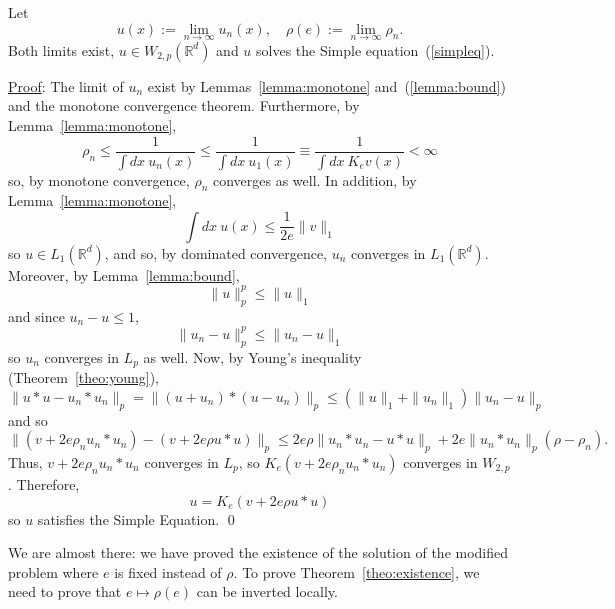 \documentclass{ian}
\begin{document}
  Let
  \begin{equation}
    u(x):=\lim_{n\to\infty}u_n(x)
    ,\quad
    \rho(e):=\lim_{n\to\infty}\rho_n
    .
  \end{equation}
  Both limits exist, $u\in W_{2,p}(\mathbb R^d)$ and $u$ solves the Simple equation\-~(\ref{simpleq}).
\endtheo
\bigskip

\indent\underline{Proof}:
  The limit of $u_n$ exist by Lemmas\-~\ref{lemma:monotone} and\-~(\ref{lemma:bound}) and the monotone convergence theorem.
  Furthermore, by Lemma\-~\ref{lemma:monotone},
  \begin{equation}
    \rho_n\leqslant\frac1{\int dx\ u_n(x)}
    \leqslant\frac1{\int dx\ u_1(x)}\equiv
    \frac1{\int dx\ K_ev(x)}<\infty
  \end{equation}
  so, by monotone convergence, $\rho_n$ converges as well.
  In addition, by Lemma\-~\ref{lemma:monotone},
  \begin{equation}
    \int dx\ u(x)\leqslant \frac1{2e}\|v\|_1
  \end{equation}
  so $u\in L_1(\mathbb R^d)$, and so, by dominated convergence, $u_n$ converges in $L_1(\mathbb R^d)$.
  Moreover, by Lemma\-~\ref{lemma:bound},
  \begin{equation}
    \|u\|_p^p\leqslant\|u\|_1
  \end{equation}
  and since $u_n-u\leqslant 1$,
  \begin{equation}
    \|u_n-u\|_p^p\leqslant\|u_n-u\|_1
  \end{equation}
  so $u_n$ converges in $L_p$ as well.
  Now, by Young's inequality (Theorem\-~\ref{theo:young}),
  \begin{equation}
    \|u\ast u-u_n\ast u_n\|_p
    =\|(u+u_n)\ast(u-u_n)\|_p
    \leqslant
    (\|u\|_1+\|u_n\|_1)\|u_n-u\|_p
  \end{equation}
  and so
  \begin{equation}
    \|(v+2e\rho_n u_n\ast u_n)-(v+2e\rho u\ast u)\|_p
    \leqslant
    2e\rho\|u_n\ast u_n-u\ast u\|_p
    +2e\|u_n\ast u_n\|_p(\rho-\rho_n)
    .
  \end{equation}
  Thus, $v+2e\rho_n u_n\ast u_n$ converges in $L_p$, so $K_e(v+2e\rho_n u_n\ast u_n)$ converges in $W_{2,p}$.
  Therefore,
  \begin{equation}
    u=K_e(v+2e\rho u\ast u)
  \end{equation}
  so $u$ satisfies the Simple Equation.
\qed
\bigskip

\indent
We are almost there: we have proved the existence of the solution of the modified problem where $e$ is fixed instead of $\rho$.
To prove Theorem\-~\ref{theo:existence}, we need to prove that $e\mapsto\rho(e)$ can be inverted locally.
\bigskip
\end{document}
